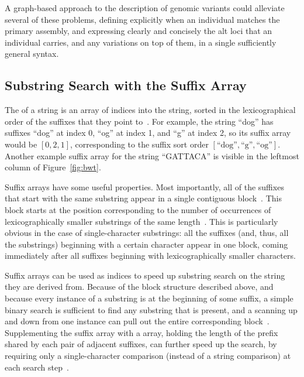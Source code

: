 A graph-based approach to the description of genomic variants could alleviate several of these problems, defining explicitly when an individual matches the primary assembly, and expressing clearly and concisely the alt loci that an individual carries, and any variations on top of them, in a single sufficiently general syntax.

\subsection{Substring Search with the Suffix Array}

The  of a string is an array of indices into the string, sorted in the lexicographical order of the suffixes that they point to~\cite{manber1993suffix}. For example, the string ``dog'' has suffixes ``dog'' at index 0, ``og'' at index 1, and ``g'' at index 2, so its suffix array would be $[0, 2, 1]$, corresponding to the suffix sort order $[\textrm{``dog''}, \textrm{``g''}, \textrm{``og''}]$. Another example suffix array for the string ``GATTACA'' is visible in the leftmost column of Figure~\ref{fig:bwt}.

Suffix arrays have some useful properties. Most importantly, all of the suffixes that start with the same substring appear in a single contiguous block~\cite{ferragina2000opportunistic}. This block starts at the position corresponding to the number of occurrences of lexicographically smaller substrings of the same length~\cite{ferragina2000opportunistic}. This is particularly obvious in the case of single-character substrings: all the suffixes (and, thus, all the substrings) beginning with a certain character appear in one block, coming immediately after all suffixes beginning with lexicographically smaller characters.

Suffix arrays can be used as indices to speed up substring search on the string they are derived from. Because of the block structure described above, and because every instance of a substring is at the beginning of some suffix, a simple binary search is sufficient to find any substring that is present, and a scanning up and down from one instance can pull out the entire corresponding block~\cite{manber1993suffix}. Supplementing the suffix array with a  array, holding the length of the prefix shared by each pair of adjacent suffixes, can further speed up the search, by requiring only a single-character comparison (instead of a string comparison) at each search step~\cite{manber1993suffix}.


